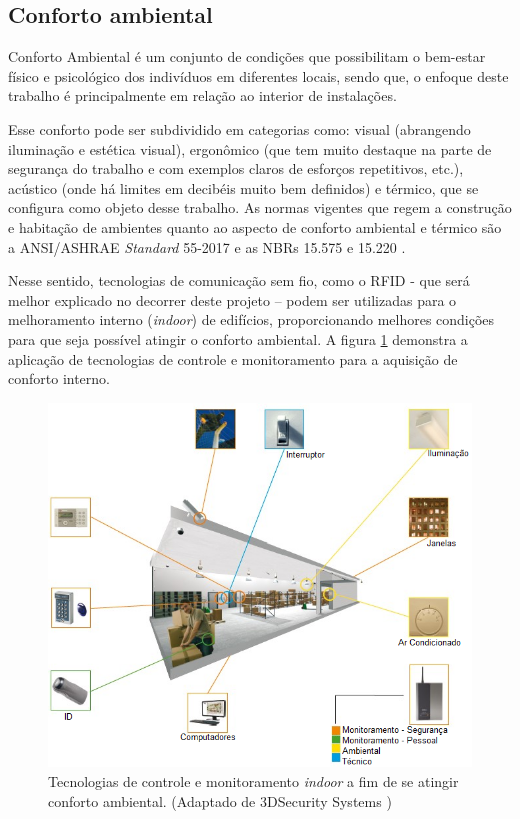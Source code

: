 \subsection{Conforto ambiental}

Conforto Ambiental é um conjunto de condições que possibilitam o bem-estar físico e psicológico dos indivíduos em diferentes locais, sendo que, o enfoque deste trabalho é principalmente em relação ao interior de instalações.

Esse conforto pode ser subdividido em categorias como: visual (abrangendo iluminação e estética visual), ergonômico (que tem muito destaque na parte de segurança do trabalho e com exemplos claros de esforços repetitivos, etc.), acústico (onde há limites em decibéis muito bem definidos) e térmico, que se configura como objeto desse trabalho. As normas vigentes que regem a construção e habitação de ambientes quanto ao aspecto de conforto ambiental e térmico são a ANSI/ASHRAE \textit{Standard} 55-2017 \cite{ASHRAE} e as NBRs 15.575 \cite{NBR15575} e 15.220 \cite{NBR15220}.

Nesse sentido, tecnologias de comunicação sem fio, como o RFID - que será melhor explicado no decorrer deste projeto – podem ser utilizadas para o melhoramento interno (\textit{indoor}) de edifícios, proporcionando melhores condições para que seja possível atingir o conforto ambiental. A figura \ref{fig:image} demonstra a aplicação de tecnologias de controle e monitoramento para a aquisição de conforto interno.

\begin{figure}[H]
    \centering
    \includegraphics[width=0.6\linewidth]{figs/Introducao/imagem.png}
    \caption{Tecnologias de controle e monitoramento \textit{indoor} a fim de se atingir conforto ambiental. (Adaptado de 3DSecurity Systems \cite{imagem})}
    \label{fig:image}
\end{figure}


